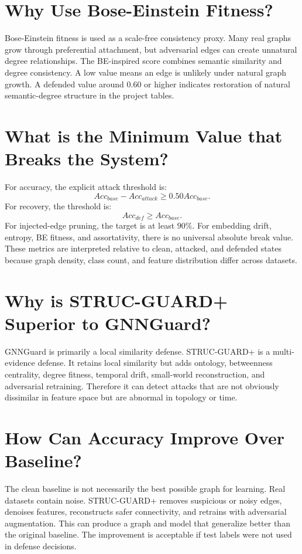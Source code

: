 \documentclass[12pt,oneside]{report}
\begin{document}
\section{Why Use Bose-Einstein Fitness?}
Bose-Einstein fitness is used as a scale-free consistency proxy. Many real graphs grow through preferential attachment, but adversarial edges can create unnatural degree relationships. The BE-inspired score combines semantic similarity and degree consistency. A low value means an edge is unlikely under natural graph growth. A defended value around $0.60$ or higher indicates restoration of natural semantic-degree structure in the project tables.

\section{What is the Minimum Value that Breaks the System?}
For accuracy, the explicit attack threshold is:
$$
Acc_{base}-Acc_{attack}\geq 0.50Acc_{base}.
$$
For recovery, the threshold is:
$$
Acc_{def}\geq Acc_{base}.
$$
For injected-edge pruning, the target is at least $90\%$. For embedding drift, entropy, BE fitness, and assortativity, there is no universal absolute break value. These metrics are interpreted relative to clean, attacked, and defended states because graph density, class count, and feature distribution differ across datasets.

\section{Why is STRUC-GUARD+ Superior to GNNGuard?}
GNNGuard is primarily a local similarity defense. STRUC-GUARD+ is a multi-evidence defense. It retains local similarity but adds ontology, betweenness centrality, degree fitness, temporal drift, small-world reconstruction, and adversarial retraining. Therefore it can detect attacks that are not obviously dissimilar in feature space but are abnormal in topology or time.

\section{How Can Accuracy Improve Over Baseline?}
The clean baseline is not necessarily the best possible graph for learning. Real datasets contain noise. STRUC-GUARD+ removes suspicious or noisy edges, denoises features, reconstructs safer connectivity, and retrains with adversarial augmentation. This can produce a graph and model that generalize better than the original baseline. The improvement is acceptable if test labels were not used in defense decisions.
\end{document}
